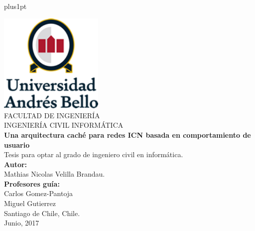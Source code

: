 \documentclass[12pt]{ociamthesis}  %
\begin{document}
\baselineskip=18pt plus1pt


\setcounter{secnumdepth}{3}
\setcounter{tocdepth}{2}


\begin{titlepage}
	\begin{center}
		\includegraphics[width=5cm]{logo2.png}\\
		\vspace{1cm}
		FACULTAD DE INGENIERÍA\\
		INGENIERÍA CIVIL INFORMÁTICA\\
		\vspace{1cm}
		\LARGE{\textbf{Una arquitectura caché para redes ICN basada en comportamiento de usuario} \\}
		\vspace{1cm}
		\small{Tesis para optar al grado de ingeniero civil en informática.}\\
		\vspace{2cm}
		\textbf{Autor:} \\
		Mathias Nicolas Velilla Brandau.\\
		\vspace{1cm}
		\textbf{Profesores guía:} \\
		Carlos Gomez-Pantoja\\
		Miguel Gutierrez\\
		\vspace{1cm}
		Santiago de Chile, Chile.\\
		\vspace{1cm}
		Junio, 2017
	\end{center}
\end{titlepage}
\end{document}

